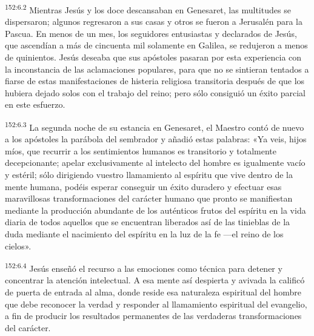 \par 
\textsuperscript{152:6.2} Mientras Jesús y los doce descansaban en Genesaret, las multitudes se dispersaron; algunos regresaron a sus casas y otros se fueron a Jerusalén para la Pascua. En menos de un mes, los seguidores entusiastas y declarados de Jesús, que ascendían a más de cincuenta mil solamente en Galilea, se redujeron a menos de quinientos. Jesús deseaba que sus apóstoles pasaran por esta experiencia con la inconstancia de las aclamaciones populares, para que no se sintieran tentados a fiarse de estas manifestaciones de histeria religiosa transitoria después de que los hubiera dejado solos con el trabajo del reino; pero sólo consiguió un éxito parcial en este esfuerzo.

\par 
\textsuperscript{152:6.3} La segunda noche de su estancia en Genesaret, el Maestro contó de nuevo a los apóstoles la parábola del sembrador y añadió estas palabras: «Ya veis, hijos míos, que recurrir a los sentimientos humanos es transitorio y totalmente decepcionante; apelar exclusivamente al intelecto del hombre es igualmente vacío y estéril; sólo dirigiendo vuestro llamamiento al espíritu que vive dentro de la mente humana, podéis esperar conseguir un éxito duradero y efectuar esas maravillosas transformaciones del carácter humano que pronto se manifiestan mediante la producción abundante de los auténticos frutos del espíritu en la vida diaria de todos aquellos que se encuentran liberados así de las tinieblas de la duda mediante el nacimiento del espíritu en la luz de la fe ---el reino de los cielos».

\par 
\textsuperscript{152:6.4} Jesús enseñó el recurso a las emociones como técnica para detener y concentrar la atención intelectual. A esa mente así despierta y avivada la calificó de puerta de entrada al alma, donde reside esa naturaleza espiritual del hombre que debe reconocer la verdad y responder al llamamiento espiritual del evangelio, a fin de producir los resultados permanentes de las verdaderas transformaciones del carácter.

